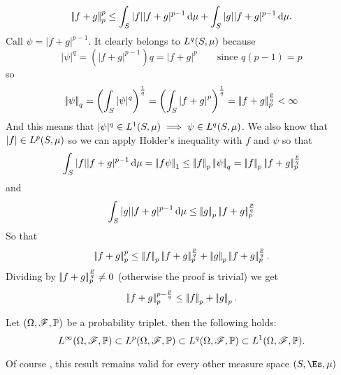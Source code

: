 \documentclass{article}
\begin{document}
\begin{fancyproof}
	\begin{equation*}
			\left|\negthinspace\left|f+g\right|\negthinspace\right|_{p}^{p}\leq \int_S|f||f+g|^{p-1}\mathop{}\!\mathrm{d}\mu+\int_S|g||f+g|^{p-1}\mathop{}\!\mathrm{d}\mu.
	\end{equation*}
	Call $\psi=|f+g|^{p-1}$. It clearly belongs to $L^{q}(S,\mu)$ because
	\begin{equation*}
		|\psi|^{q}=\left(|f+g|^{p-1}\right)q=\left|f+g\right|^{p}\qquad\text{since }q(p-1)=p
	\end{equation*}
	so
	\begin{equation*}
		\left|\negthinspace\left|\psi\right|\negthinspace\right|_{q}=\left(\int_S|\psi|^q\right)^{\frac{1}{q}}=\left(\int_S\left|f+g\right|^{p}\right)^{\frac{1}{q}}=\left|\negthinspace\left|f+g\right|\negthinspace\right|_{p}^{\frac{p}{q}}<\infty
	\end{equation*}
	And this means that $|\psi|^{q}\in L^{1}(S,\mu)\implies\psi\in L^{q}(S,\mu)$. We also know that $|f|\in L^{p}(S,\mu)$ so we can apply Holder's inequality with $f$ and $\psi$ so that
	\begin{equation*}
		\int_S|f||f+g|^{p-1}\dmu=\norm{f\psi}_1\leq\norm{f}_p\norm{\psi}_q=\norm{f}_p\norm{f+g}_p^{\frac{p}{q}}
	\end{equation*}
	and
	\begin{equation*}
		\int_S|g||f+g|^{p-1}\mathop{}\!\mathrm{d}\mu\leq\left|\negthinspace\left|g\right|\negthinspace\right|_p\left|\negthinspace\left|f+g\right|\negthinspace\right|_p^{\frac{p}{q}}
	\end{equation*}
	So that
	\begin{equation*}
		\norm{f+g}_p^p\leq\norm{f}_p\norm{f+g}_p^{\frac{p}{q}}+\norm{g}_p\norm{f+g}_p^{\frac{p}{q}}.
	\end{equation*}
	Dividing by $\left|\negthinspace\left|f+g\right|\negthinspace\right|_p^{\frac{p}{q}}\neq0$ (otherwise the proof is trivial) we get
	\begin{equation*}
		\left|\negthinspace\left|f+g\right|\negthinspace\right|_p^{p-\frac{p}{q}}\leq\left|\negthinspace\left|f\right|\negthinspace\right|_p+\left|\negthinspace\left|g\right|\negthinspace\right|_p.
	\end{equation*}
\end{fancyproof}
\begin{proposition}
	Let $(\Omega,\mathscr{F},\mathbb{P})$ be a probability triplet. then the following holds:
	\begin{equation*}
		L^{\infty}(\Omega,\mathscr{F},\mathbb{P})\subset L^{p}(\Omega,\mathscr{F},\mathbb{P})\subset L^{q}(\Omega,\mathscr{F},\mathbb{P})\subset L^{1}(\Omega,\mathscr{F},\mathbb{P}).
	\end{equation*}
\end{proposition}
Of course , this result remains valid for every other measure space $(S,\Es,\mu)$
\end{document}
